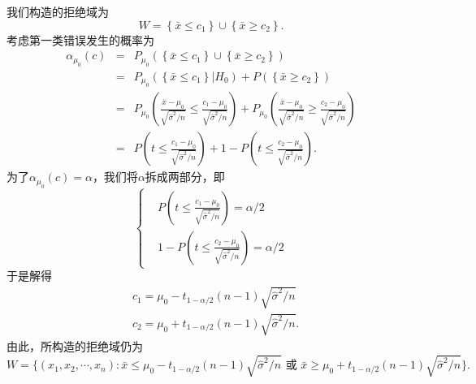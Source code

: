 \begin{solution}
    我们构造的拒绝域为
    $$
    W = \left\{\bar{x} \leq c_1\right\} \cup \left\{\bar{x} \geq c_2\right\}.
    $$
    考虑第一类错误发生的概率为
    \begin{eqnarray*}
        \alpha_{\mu_0}(c) &=& P_{\mu_0}\left(\left\{\bar{x} \leq c_1\right\} \cup \left\{\bar{x} \geq c_2\right\}\right) \\
        &=& P_{\mu_0}\left(\left\{\bar{x} \leq c_1\right\} |H_0\right) + P\left( \left\{\bar{x} \geq c_2\right\}\right) \\
        &=& P_{\mu_0}\left(\frac{\bar{x} - \mu_0}{\sqrt{\hat{\sigma}^2/n}} \leq \frac{c_1 - \mu_0}{\sqrt{\hat{\sigma}^2/n}}\right) + P_{\mu_0}\left(\frac{\bar{x} - \mu_0}{\sqrt{\hat{\sigma}^2/n}} \geq \frac{c_2 - \mu_0}{\sqrt{\hat{\sigma}^2/n}}\right)\\
        &=& P\left( t \leq \frac{c_1 - \mu_0}{\sqrt{\hat{\sigma}^2/n}} \right) + 1 - P\left( t \leq \frac{c_2 - \mu_0}{\sqrt{\hat{\sigma}^2/n}}\right).
    \end{eqnarray*}
    为了$ \alpha_{\mu_0}(c) = \alpha$，我们将$\alpha$拆成两部分，即
    $$
    \left\{
    \begin{aligned}
       & P\left( t \leq \frac{c_1 - \mu_0}{\sqrt{\hat{\sigma}^2/n}} \right) = \alpha/2\\
        & 1 - P\left( t \leq \frac{c_2 - \mu_0}{\sqrt{\hat{\sigma}^2/n}}\right) = \alpha/2
    \end{aligned}
    \right.
    $$
    于是解得
    \begin{equation*}
        \begin{aligned}
       & c_1 = \mu_0 - t_{1-\alpha/2}(n-1)\sqrt{\hat{\sigma}^2/n} \\
       & c_2 = \mu_0 + t_{1-\alpha/2}(n-1)\sqrt{\hat{\sigma}^2/n} .
    \end{aligned}
    \end{equation*}
    由此，所构造的拒绝域仍为
    $$
     W = \{(x_1,x_2,\cdots,x_n): \bar{x} \leq \mu_0 - t_{1-\alpha/2}(n-1)\sqrt{\hat{\sigma}^2/n} \text{ 或 }  \bar{x} \geq \mu_0 + t_{1-\alpha/2}(n-1)\sqrt{\hat{\sigma}^2/n}\}.
    $$
\end{solution}
